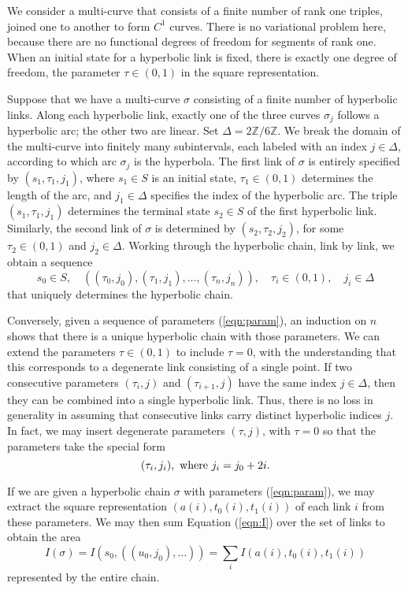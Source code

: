 \documentclass[11pt]{amsart}
\newcommand{\ring}[1]{\mathbb{#1}}
\def\ta{{\tau}}
\begin{document}
We consider a multi-curve that consists of a finite number of rank one
triples, joined one to another to form $C^1$ curves.  There is no
variational problem here, because there are no functional degrees of
freedom for segments of rank one.  When an initial state for a
hyperbolic link is fixed, there is exactly one degree of freedom, the
parameter $\ta\in(0,1)$ in the square representation.

Suppose that we have a multi-curve $\sigma$ consisting of a finite
number of hyperbolic links.  Along each hyperbolic link, exactly one
of the three curves $\sigma_j$ follows a hyperbolic arc; the other two
are linear.  Set $\Delta=2\ring{Z}/6\ring{Z}$.  We break the domain of
the multi-curve into finitely many subintervals, each labeled with an
index $j\in\Delta$, according to which arc $\sigma_j$ is the
hyperbola.  The first link of $\sigma$ is entirely specified by
$(s_1,\ta_1,j_1)$, where $s_1\in S$ is an initial state,
$\ta_1\in(0,1)$ determines the length of the arc, and $j_1\in\Delta$
specifies the index of the hyperbolic arc.  The triple 
$(s_1,\ta_1,j_1)$ determines the terminal state $s_2\in S$ of the first
hyperbolic link.  Similarly, the second link of $\sigma$ is determined
by $(s_2,\ta_2,j_2)$, for some $\ta_2\in (0,1)$ and $j_2\in\Delta$.
Working through the hyperbolic chain, link by link, we obtain a
sequence
\begin{equation}\label{eqn:param}
  s_0\in S,\quad ((\ta_0,j_0),(\ta_1,j_1),\ldots,
(\ta_n,j_n)),\quad \ta_i\in(0,1),\quad j_i\in\Delta
\end{equation}
that uniquely determines the hyperbolic chain.

Conversely, given a sequence of parameters (\ref{eqn:param}), an
induction on $n$ shows that there is a unique hyperbolic chain with
those parameters.  We can extend the parameters $\ta\in (0,1)$ to
include $\ta=0$, with the understanding that this corresponds to a
degenerate link consisting of a single point.  If two consecutive
parameters $(\ta_i,j)$ and $(\ta_{i+1},j)$ have the same index
$j\in\Delta$, then they can be combined into a single hyperbolic link.
Thus, there is no loss in generality in assuming that consecutive
links carry distinct hyperbolic indices $j$.  In fact, we may insert
degenerate parameters $(\ta,j)$, with $\ta=0$ so that the parameters
take the special form
\begin{equation}\label{eqn:ji}
  (\ta_i,j_i),\hbox{ where } j_i = j_0 + 2 i.
\end{equation}

If we are given a hyperbolic chain $\sigma$ 
with parameters (\ref{eqn:param}),
we may extract the square representation $(a(i),t_0(i),t_1(i))$
of each
link $i$ from these parameters.  We may then sum Equation (\ref{eqn:I})
over the set of links to obtain the area
\begin{equation}\label{eqn:Isigma}
I(\sigma) = I(s_0,((u_0,j_0),\ldots)) = \sum_i I(a(i),t_0(i),t_1(i))
\end{equation}
represented by the entire chain.
\end{document}
